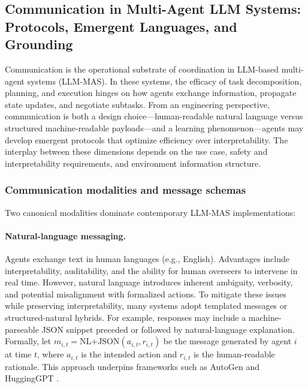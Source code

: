 \subsection{Communication in Multi-Agent LLM Systems: Protocols, Emergent Languages, and Grounding}

Communication is the operational substrate of coordination in LLM-based multi-agent systems (LLM-MAS). In these systems, the efficacy of task decomposition, planning, and execution hinges on how agents exchange information, propagate state updates, and negotiate subtasks. From an engineering perspective, communication is both a design choice—human-readable natural language versus structured machine-readable payloads—and a learning phenomenon—agents may develop emergent protocols that optimize efficiency over interpretability. The interplay between these dimensions depends on the use case, safety and interpretability requirements, and environment information structure.

\subsubsection{Communication modalities and message schemas}

Two canonical modalities dominate contemporary LLM-MAS implementations:

\paragraph{Natural-language messaging.} Agents exchange text in human languages (e.g., English). Advantages include interpretability, auditability, and the ability for human overseers to intervene in real time. However, natural language introduces inherent ambiguity, verbosity, and potential misalignment with formalized actions. To mitigate these issues while preserving interpretability, many systems adopt templated messages or structured-natural hybrids. For example, responses may include a machine-parseable JSON snippet preceded or followed by natural-language explanation. Formally, let $m_{i,t} = \text{NL+JSON}(a_{i,t}, r_{i,t})$ be the message generated by agent $i$ at time $t$, where $a_{i,t}$ is the intended action and $r_{i,t}$ is the human-readable rationale. This approach underpins frameworks such as AutoGen and HuggingGPT \cite{autogen, hugginggpt, agentic_survey}.

